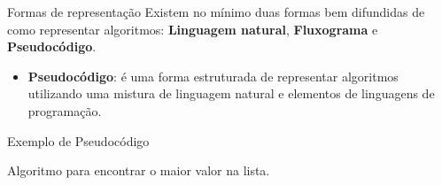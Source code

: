 \begin{frame}{Formas de representação}
  Existem no mínimo duas formas bem difundidas de como representar algoritmos: \textbf{Linguagem natural}, \textbf{Fluxograma} e \textbf{Pseudocódigo}.
  \begin{itemize}
    \item \textbf{Pseudocódigo}:  é uma forma estruturada de representar algoritmos utilizando uma mistura de linguagem natural e elementos de linguagens de programação.
  \end{itemize}
\end{frame}

\begin{frame}{Exemplo de Pseudocódigo}
  \begin{algorithm}[H]
    \SetAlgoLined
    \label{alg1}
    \caption{Algoritmo para encontrar o maior valor na lista.}
  \end{algorithm}
\end{frame}

